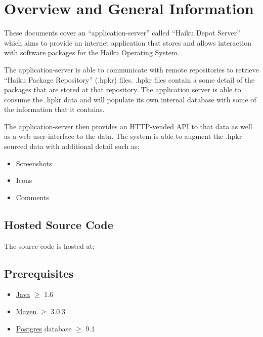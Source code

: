 \section{Overview and General Information}

These documents cover an ``application-server'' called ``Haiku Depot Server'' which aims to provide an internet application that stores and allows interaction with software packages for the \href{http://www.haiku-os.org}{Haiku Operating System}.

The application-server is able to communicate with remote repositories to retrieve ``Haiku Package Repository'' (.hpkr) files.  .hpkr files contain a some detail of the packages that are stored at that repository.  The application server is able to consume the .hpkr data and will populate its own internal database with some of the information that it contains.

The application-server then provides an HTTP-vended API to that data as well as a web user-interface to the data.  The system is able to augment the .hpkr sourced data with additional detail such as;

\begin{itemize}
\item Screenshots
\item Icons
\item Comments
\end{itemize}

\subsection{Hosted Source Code}

The source code is hosted at;


\subsection{Prerequisites}
\label{prerequisites}

\begin{itemize}
\item \href{https://community.java.net/open-jdk}{Java} $\geqslant$ 1.6
\item \href{http://maven.apache.org}{Maven} $\geqslant$ 3.0.3
\item \href{http://www.postgres.org}{Postgres} database $\geqslant$ 9.1
\end{itemize}

